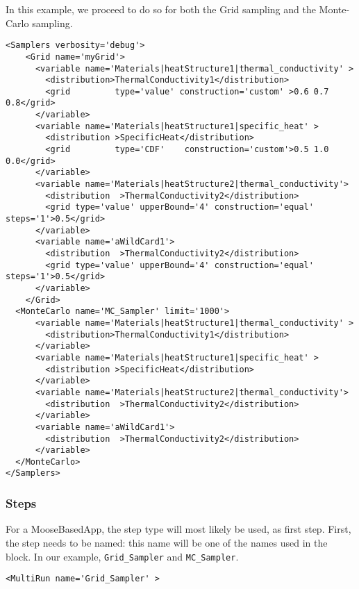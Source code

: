 In this example, we proceed to do so for both the Grid sampling and the Monte-Carlo sampling.
\begin{lstlisting}[style=XML,morekeywords={name,type,construction,lowerBound,steps,limit,initialSeed}]
<Samplers verbosity='debug'>
    <Grid name='myGrid'>
      <variable name='Materials|heatStructure1|thermal_conductivity' >
        <distribution>ThermalConductivity1</distribution>
        <grid         type='value' construction='custom' >0.6 0.7 0.8</grid>
      </variable>
      <variable name='Materials|heatStructure1|specific_heat' >
        <distribution >SpecificHeat</distribution>
        <grid         type='CDF'    construction='custom'>0.5 1.0 0.0</grid>
      </variable>
      <variable name='Materials|heatStructure2|thermal_conductivity'>
        <distribution  >ThermalConductivity2</distribution>
        <grid type='value' upperBound='4' construction='equal' steps='1'>0.5</grid>
      </variable>
      <variable name='aWildCard1'>
        <distribution  >ThermalConductivity2</distribution>
        <grid type='value' upperBound='4' construction='equal' steps='1'>0.5</grid>
      </variable>
    </Grid>
  <MonteCarlo name='MC_Sampler' limit='1000'>
      <variable name='Materials|heatStructure1|thermal_conductivity' >
        <distribution>ThermalConductivity1</distribution>
      </variable>
      <variable name='Materials|heatStructure1|specific_heat' >
        <distribution >SpecificHeat</distribution>
      </variable>
      <variable name='Materials|heatStructure2|thermal_conductivity'>
        <distribution  >ThermalConductivity2</distribution>
      </variable>
      <variable name='aWildCard1'>
        <distribution  >ThermalConductivity2</distribution>
      </variable>
  </MonteCarlo>
</Samplers>
\end{lstlisting}
\subsubsection{Steps}
For a MooseBasedApp, the  step type will most likely be
used, as first step.
%
First, the step needs to be named: this name will be one of the names used in
the  block.
%
In our example, \texttt{Grid\_Sampler} and \texttt{MC\_Sampler}.
%
\begin{lstlisting}[style=XML,morekeywords={name,debug,re-seeding}]
     <MultiRun name='Grid_Sampler' >
\end{lstlisting}

